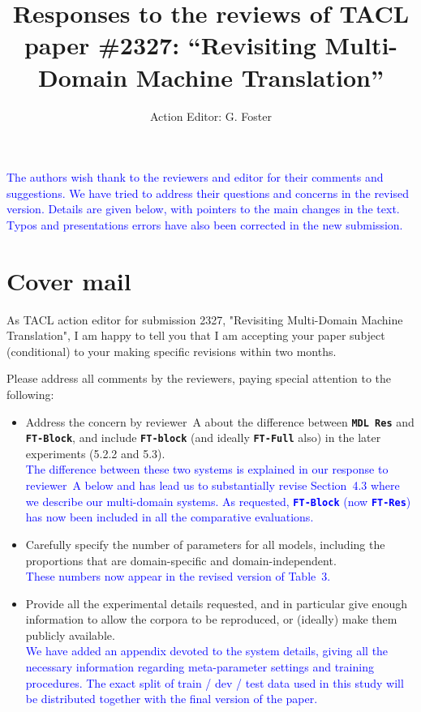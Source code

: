 \documentclass[12pt,times,a4paper,twoside]{article}
\title{Responses to the reviews of TACL paper \#2327:
  ``Revisiting Multi-Domain Machine Translation''
}
\author{Action Editor: G. Foster}
\date{}
\theoremstyle{definition}
\newcommand{\system}[1]{\texttt{\textbf{#1}}}
\begin{document}
\maketitle

\textcolor{blue}{The authors wish thank to the reviewers and editor for their comments and suggestions. We have tried to address their questions and concerns in the revised version. Details are given below, with pointers to the main changes in the text. Typos and presentations errors have also been corrected in the new submission.}

\section*{Cover mail}
As TACL action editor for submission 2327, "Revisiting Multi-Domain Machine Translation", I am happy to tell you that I am accepting your paper subject (conditional) to your making specific revisions within two months.

Please address all comments by the reviewers, paying special attention to the following:
\begin{itemize}
\item Address the concern by reviewer~A about the difference between \system{MDL Res} and \system{FT-Block}, and include \system{FT-block} (and ideally \system{FT-Full} also) in the later experiments (5.2.2 and 5.3). \\
  \textcolor{blue}{The difference between these two systems is explained in our response to reviewer~A below and has lead us to substantially revise Section~4.3 where we describe our multi-domain systems. As requested, \system{FT-Block} (now \system{FT-Res}) has now been included in all the comparative evaluations. }
\item Carefully specify the number of parameters for all models, including the proportions that are domain-specific and domain-independent. \\
  \textcolor{blue}{These numbers now appear in the revised version of Table~3.}
\item Provide all the experimental details requested, and in particular give enough information to allow the corpora to be reproduced, or (ideally) make them publicly available.\\
  \textcolor{blue}{We have added an appendix devoted to the system details, giving all the necessary information regarding meta-parameter settings and training procedures. The exact split of train / dev / test data used in this study will be distributed together with the final version of the paper.}
\end{itemize}
\end{document}
